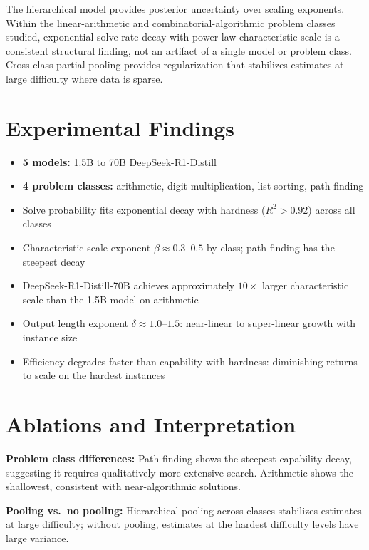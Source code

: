 \documentclass[10pt,twocolumn]{article}
\begin{document}
The hierarchical model provides posterior uncertainty over scaling exponents.
Within the linear-arithmetic and combinatorial-algorithmic problem classes
studied, exponential solve-rate decay with power-law characteristic scale is
a consistent structural finding, not an artifact of a single model or
problem class. Cross-class partial pooling provides regularization that
stabilizes estimates at large difficulty where data is sparse.

\section{Experimental Findings}

\begin{itemize}[itemsep=2pt,parsep=0pt]
  \item \textbf{5 models:} 1.5B to 70B DeepSeek-R1-Distill
  \item \textbf{4 problem classes:} arithmetic, digit multiplication, list
    sorting, path-finding
  \item Solve probability fits exponential decay with hardness ($R^2 > 0.92$)
    across all classes
  \item Characteristic scale exponent $\beta \approx 0.3$--$0.5$ by class;
    path-finding has the steepest decay
  \item DeepSeek-R1-Distill-70B achieves approximately $10\times$ larger
    characteristic scale than the 1.5B model on arithmetic
  \item Output length exponent $\delta \approx 1.0$--$1.5$: near-linear to
    super-linear growth with instance size
  \item Efficiency degrades faster than capability with hardness: diminishing
    returns to scale on the hardest instances
\end{itemize}

\section{Ablations and Interpretation}

\textbf{Problem class differences:} Path-finding shows the steepest capability
decay, suggesting it requires qualitatively more extensive search. Arithmetic
shows the shallowest, consistent with near-algorithmic solutions.

\textbf{Pooling vs.\ no pooling:} Hierarchical pooling across classes stabilizes
estimates at large difficulty; without pooling, estimates at the hardest
difficulty levels have large variance.
\end{document}
